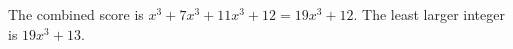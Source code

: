 The combined score is $x^3+7x^3+11x^3+12=19x^3+12$. The least larger integer is $\boxed{19x^3+13}$.
